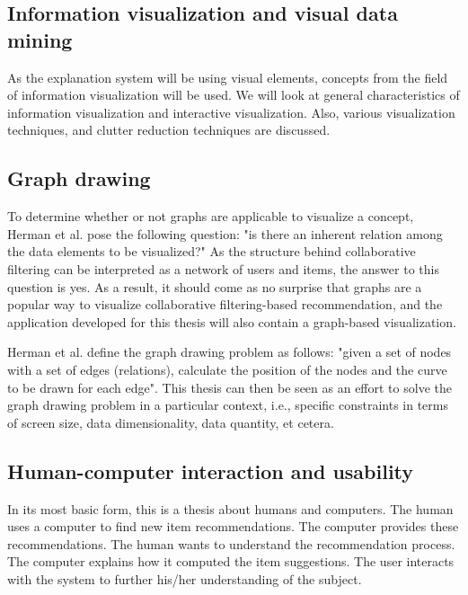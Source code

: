 \subsection{Information visualization and visual data mining}\label{chapter:introduction:section:perspective:subsection:infovis}

As the explanation system will be using visual elements, concepts from the field of information visualization will be used. We will look at general characteristics of information visualization and interactive visualization. Also, various visualization techniques, and clutter reduction techniques are discussed.


\subsection{Graph drawing}\label{chapter:introduction:section:perspective:subsection:graph}

To determine whether or not graphs are applicable to visualize a concept, Herman et al. \cite{herman:2000} pose the following question: "is there an inherent relation among the data elements to be visualized?" As the structure behind collaborative filtering can be interpreted as a network of users and items, the answer to this question is yes. As a result, it should come as no surprise that graphs are a popular way to visualize collaborative filtering-based recommendation\cite{bostandjiev:2012, gretarsson:2010}, and the application developed for this thesis will also contain a graph-based visualization.

Herman et al. \cite{herman:2000} define the graph drawing problem as follows: "given a set of nodes with a set of edges (relations), calculate the position of the nodes and the curve to be drawn for each edge". This thesis can then be seen as an effort to solve the graph drawing problem in a particular context, i.e., specific constraints in terms of screen size, data dimensionality, data quantity, et cetera.


\subsection{Human-computer interaction and usability}\label{chapter:introduction:section:perspective:subsection:hci}

In its most basic form, this is a thesis about humans and computers. The human uses a computer to find new item recommendations. The computer provides these recommendations. The human wants to understand the recommendation process. The computer explains how it computed the item suggestions. The user interacts with the system to further his/her understanding of the subject.

